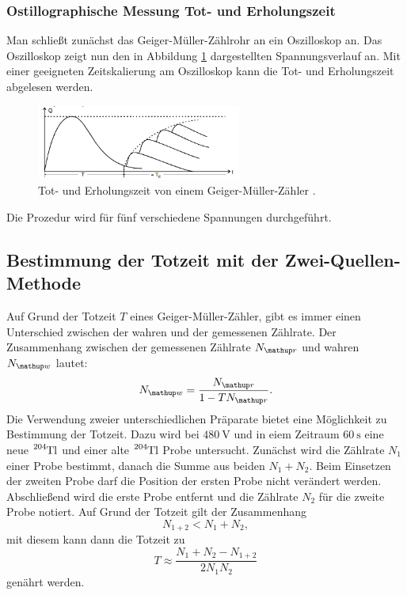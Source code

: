 \subsubsection{Ostillographische Messung Tot- und Erholungszeit} %
Man schließt zunächst das Geiger-Müller-Zählrohr an ein
Oszilloskop an. Das Oszilloskop zeigt nun den in Abbildung \ref{fig: totzeit}
dargestellten Spannungsverlauf an. Mit einer geeigneten Zeitskalierung am Oszilloskop
kann die Tot- und Erholungszeit abgelesen werden.
\begin{figure}
  \centering
  \includegraphics[width=0.6\textwidth]{bilder/totzeit.png}
  \caption{Tot- und Erholungszeit von einem Geiger-Müller-Zähler \cite{anleitung703}.}
  \label{fig: totzeit}
  \end{figure}
Die Prozedur wird für fünf verschiedene Spannungen durchgeführt.

\subsection{Bestimmung der Totzeit mit der Zwei-Quellen-Methode}
Auf Grund der Totzeit $T$ eines Geiger-Müller-Zähler, gibt es immer einen
Unterschied zwischen der wahren und der gemessenen Zählrate. %
Der Zusammenhang zwischen der gemessenen Zählrate $N\ua{r}$ und
wahren $N\ua{w}$ lautet: %
\begin{equation}
  \label{eq:wahre_zaehlrate}
  N\ua{w}=\frac{N\ua{r}}{1-TN\ua{r}}.
\end{equation}
Die Verwendung zweier unterschiedlichen Präparate bietet eine Möglichkeit zu %
Bestimmung der Totzeit. Dazu wird bei $\SI{480}{\volt}$ und in eiem Zeitraum $\SI{60}{\second}$ eine neue %
$\ce{^{204}Tl}$ und einer alte $\ce{^{204}Tl}$ Probe untersucht. %
Zunächst wird die Zählrate  $N_1$ einer Probe bestimmt, danach die %
Summe aus beiden $N_1+N_2$. Beim Einsetzen der zweiten Probe darf die Position der
ersten Probe nicht verändert werden.
Abschließend wird die erste Probe entfernt und die Zählrate $N_2$ für die zweite
Probe notiert.
Auf Grund der Totzeit gilt der Zusammenhang
\begin{equation}
  \label{eq:totzeit_summe}
  N_{1+2}<N_1+N_2,
\end{equation}
mit diesem kann dann die Totzeit zu %
\begin{equation}
  \label{eq:totzeit}
  T\approx \frac{N_1+N_2-N_{1+2}}{2N_1N_2}
\end{equation}
genährt werden.

